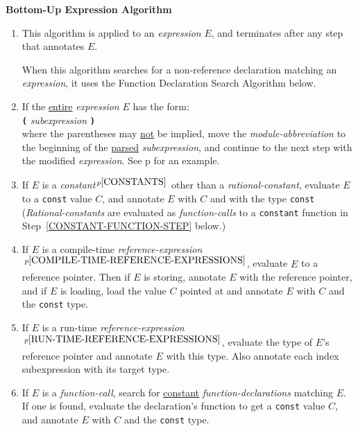 \documentclass[12pt]{article}
\newcommand{\TT}[1]{{\tt \bfseries #1}}
\newcommand{\pagref}[1]{p\pageref{#1}}
\newcommand{\pagnote}[1]{$\,^{p\pageref{#1}}$}
\begin{document}
\centerline{\bf Bottom-Up Expression Algorithm}
\begin{enumerate}

\item This algorithm is applied to an {\em expression} $E$, and
terminates after any step that annotates $E$.

When this algorithm searches for a non-reference
declaration matching an {\em expression},
it uses the Function Declaration Search Algorithm below.

\item\label{MODULE-PROPAGATION-STEP}
If the \underline{entire} {\em expression} $E$ has the form: \\
\hspace*{2in}{\em module-abbreviation} \TT{(} {\em subexpression} \TT{)} \\
where the parentheses may \underline{not}
be implied, move the {\em module-abbreviation}
to the beginning of the \underline{parsed} {\em subexpression}, and
continue to the next step with the modified {\em expression}.
See \pagref{MA-SYNTACTIC-SUGAR} for an example.

\item\label{CONSTANT-STEP}
If $E$ is a {\em constant}\pagnote{CONSTANTS} other than
a {\em rational-constant}, evaluate $E$
to a {\tt const} value $C$, and annotate $E$
with $C$ and with the type {\tt const}
({\em Rational-constants} are evaluated as {\em function-calls} to
a {\tt constant} function in Step~\ref{CONSTANT-FUNCTION-STEP} below.)

\item\label{COMPILE-TIME-REFERENCE-EXPRESSION-STEP}
If $E$ is a compile-time
{\em reference-expression}\pagnote{COMPILE-TIME-REFERENCE-EXPRESSIONS},
evaluate $E$ to a reference pointer.  Then if $E$ is storing, annotate
$E$ with the reference pointer, and if $E$ is loading, load the value $C$
pointed at and annotate $E$ with $C$ and the {\tt const} type.

\item\label{RUN-TIME-REFERENCE-EXPRESSION-STEP}
If $E$ is a run-time
{\em reference-expression}\pagnote{RUN-TIME-REFERENCE-EXPRESSIONS},
evaluate the type of $E$'s reference pointer and annotate
$E$ with this type.  Also annotate each index subexpression with its
target type.

\item\label{CONSTANT-FUNCTION-STEP}
If $E$ is a {\em function-call},
search for \underline{constant} {\em function-declarations}
matching $E$.  If one is found,
evaluate the declaration's function to get a {\tt const} value $C$,
and annotate $E$ with $C$ and the {\tt const} type.


\end{enumerate}
\end{document}
